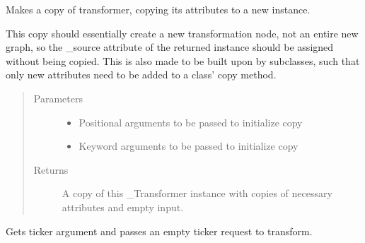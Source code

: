 \documentclass[letterpaper,10pt,english]{sphinxmanual}
\begin{document}
\begin{fulllineitems}
\begin{fulllineitems}
\label{\detokenize{dalio.pipe:dalio.pipe.builders.StockComps.copy}}
Makes a copy of transformer, copying its attributes to a new
instance.

This copy should essentially create a new transformation node, not an
entire new graph, so the \_source attribute of the returned instance
should be assigned without being copied. This is also made to be built
upon by subclasses, such that only new attributes need to be added to
a class’ copy method.
\begin{quote}\begin{description}
\item[{Parameters}] \leavevmode\begin{itemize}
\item {} 
 \textendash{} Positional arguments to be passed to initialize copy

\item {} 
 \textendash{} Keyword arguments to be passed to initialize copy

\end{itemize}

\item[{Returns}] \leavevmode
A copy of this \_Transformer instance with copies of necessary
attributes and empty input.

\end{description}\end{quote}

\end{fulllineitems}


\begin{fulllineitems}
\end{fulllineitems}


\begin{fulllineitems}
\label{\detokenize{dalio.pipe:dalio.pipe.builders.StockComps.run}}
Gets ticker argument and passes an empty ticker request to
transform.


\end{fulllineitems}
\end{fulllineitems}
\end{document}
